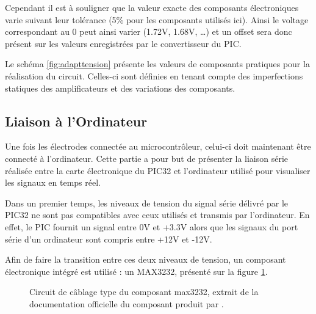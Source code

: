 \documentclass[letterpaper, twoside, 12pt, memoire, creativecommons, hyperref]{thETS}
\begin{document}
Cependant il est à souligner que la valeur exacte des composants électroniques varie suivant leur tolérance (5\% pour les composants utilisés ici). Ainsi le voltage correspondant au 0 peut ainsi varier (1.72V, 1.68V, …) et un offset sera donc présent sur les valeurs enregistrées par le convertisseur du PIC. 

Le schéma \ref{fig:adapttension} présente les valeurs de composants pratiques pour la réalisation du circuit. Celles-ci sont définies en tenant compte des imperfections statiques des amplificateurs et des variations des composants.


\subsection{Liaison à l'Ordinateur}

Une fois les électrodes connectée au microcontrôleur, celui-ci doit maintenant être connecté à l'ordinateur. Cette partie a pour but de présenter la liaison série réalisée entre la carte électronique du PIC32 et l'ordinateur utilisé pour visualiser les signaux en temps réel.

Dans un premier temps, les niveaux de tension du signal série délivré par le PIC32 ne sont pas compatibles avec ceux utilisés et transmis par l'ordinateur. En effet, le PIC fournit un signal entre 0V et +3.3V alors que les signaux du port série d'un ordinateur sont compris entre +12V et -12V. 

Afin de faire la transition entre ces deux niveaux de tension, un composant électronique intégré est utilisé : un MAX3232, présenté sur la figure \ref{fig:max3232}.

\begin{figure}
	\centering
	\caption{Circuit de câblage type du composant max3232, extrait de la documentation officielle du composant produit par \cite{MAXIM3232}.}
	\label{fig:max3232}
\end{figure}
\end{document}
